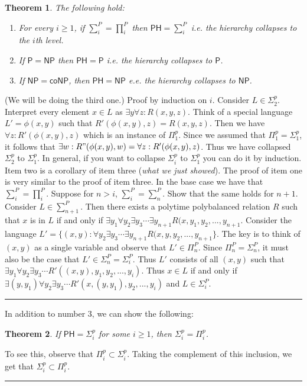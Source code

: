 \documentclass[twoside]{article}
\newcounter{lecnum}
\newtheorem{theorem}{Theorem}[lecnum]
\newenvironment{proof}{{\bf Proof:}}{\hfill\rule{2mm}{2mm}}
\def\P{\mathsf{P}}
\def\NP{\mathsf{NP}}
\def\coNP{\mathsf{coNP}}
\def\PH{\mathsf{PH}}
\begin{document}
\begin{theorem}
The following hold:
\begin{enumerate}
\item For every $i \geq 1$, if $\sum^P_i = \prod^P_i$ then $\PH = \sum^P_i$ i.e. the hierarchy collapses to the $i$th level.
\item If $\P = \NP$ then $\PH = \P$ i.e. the hierarchy collapses to $\P$.
\item If $\NP = \coNP$, then $\PH = \NP$ e.e. the hierarchy collapses to $\NP$.  
\end{enumerate}
\end{theorem}
\begin{proof}
(We will be doing the third one.) Proof by induction on $i$. Consider $L \in \Sigma_{2}^{p}$. Interpret every element $x \in L$ as $\exists y \forall z: R(x,y,z)$. Think of a special language $L' = \phi(x,y)$ such that $R'(\phi (x,y), z) = R(x,y,z)$. Then we have $\forall z: R'(\phi(x,y), z)$ which is an instance of $\Pi_{1}^{p}$. Since we assumed that $\Pi_{1}^{p} = \Sigma_{1}^{p}$, it follows that $\exists w: R"(\phi(x,y), w) = \forall z: R'(\phi(x,y), z)$. Thus we have collapsed $\Sigma_{2}^{p}$ to $\Sigma_{1}^{p}$. In general, if you want to collapse $\Sigma_{i}^{p}$ to $\Sigma_{1}^{p}$ you can do it by induction. Item two is a corollary of item three (\emph{what we just showed}). The proof of item one is very similar to the proof of item three. In the base case we have that $\sum^P_i = \prod^P_i$. Suppose for $n > i$, $\sum^P_i = \sum^P_n$. Show that the same holds for $n+1$. Consider $L \in \sum^P_{n+1}$. Then there exists a polytime polybalanced relation $R$ such that $x$ is in $L$ if and only if  $\exists y_1\forall y_2\exists y_3 \cdots \exists y_{n+1} R(x, y_1, y_2, ..., y_{n+1}$. Consider the language $L' = \{(x,y): \forall y_2\exists y_3 \cdots \exists y_{n+1} R(x,y,y_2, ..., y_{n+1}\}$. The key is to think of $(x,y)$ as a single variable and observe that $L' \in \Pi^P_{n}$. Since $\Pi^P_{n} = \Sigma^P_{n}$, it must also be the case that $L' \in \Sigma^P_{n} = \Sigma^P_i$. Thus $L'$ consists of all $(x,y)$ such that $\exists y_1\forall y_2\exists y_3 \cdots R'((x,y), y_1, y_2, ..., y_{i})$. Thus $x \in L$ if and only if $\exists (y, y_1)\forall y_2\exists y_3 \cdots R'(x, (y, y_1), y_2, ..., y_{i})$ and $L \in \Sigma^P_{i}$.   
\end{proof}

In addition to number 3, we can show the following:
\begin{theorem}
If $\PH = \Sigma^p_i$ for some $i \geq 1$, then $\Sigma^p_i = \Pi^p_i$. 
\end{theorem}
\begin{proof}
To see this, observe that $\Pi^p_i \subset \Sigma^p_i$. Taking the complement of this inclusion, we get that $\Sigma^p_i \subset \Pi^p_i$.
\end{proof}
\end{document}
